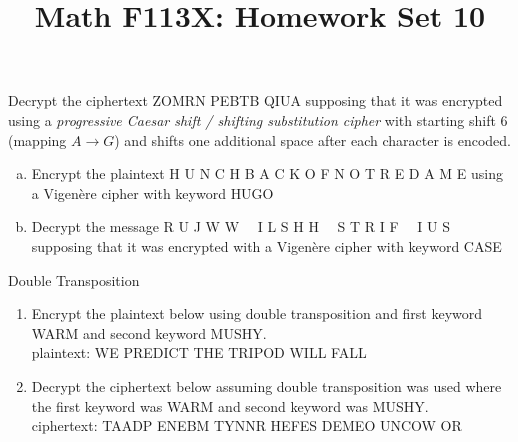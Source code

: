 \documentclass[11pt, oneside]{article}   	%
\title{Math F113X: Homework Set 10}
\date{}							%
\newcommand{\be}{\begin{enumerate}}
\newcommand{\ee}{\end{enumerate}}
\begin{document}
\maketitle

\vspace{-1.5cm}



  Decrypt the ciphertext \textsf{ZOMRN PEBTB QIUA} supposing that  it was encrypted using a \emph{progressive Caesar shift / shifting substitution  cipher} with starting shift 6 (mapping $A \to G$) and shifts one additional space after each character is encoded.


\be[(a)]
\item Encrypt the plaintext \textsf{H U N C H B A C K O F N O T R E D A M E} using a Vigen\`ere cipher with keyword \textsf{HUGO}
\item Decrypt the message \textsf{R U J W W \ \ I L S H H \ \ S T R I F \ \  I U S} supposing that it was encrypted with a Vigen\`ere cipher with keyword \textsf{CASE}
\ee

 Double Transposition
	\begin{enumerate}
	\item[(a)] Encrypt the plaintext below using double transposition and first keyword WARM and second keyword MUSHY.\\
	plaintext: WE PREDICT THE TRIPOD WILL FALL\\
	\item[(b)] Decrypt the ciphertext below assuming double transposition was used where the first keyword was WARM and second keyword was MUSHY.\\
	ciphertext:  TAADP ENEBM TYNNR HEFES DEMEO UNCOW OR\\
	\end{enumerate}
\vfill
\hrulefill
\end{document}
